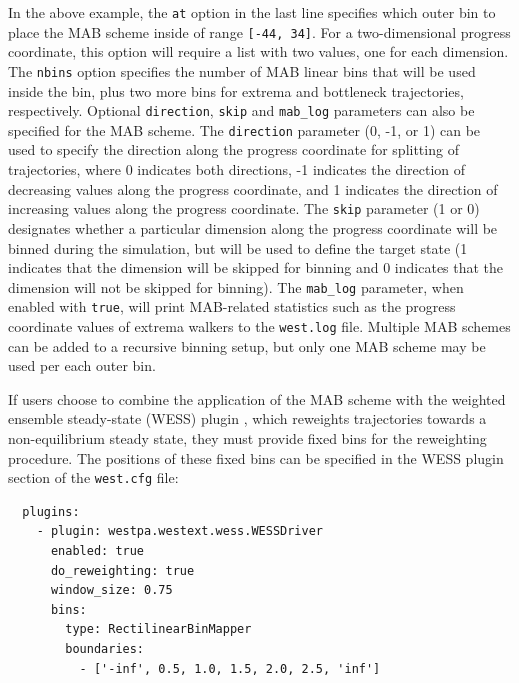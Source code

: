 In the above example, the \verb|at| option in the last line specifies which outer bin to place the MAB scheme inside of range \verb|[-44, 34]|. 
For a two-dimensional progress coordinate, this option will require a list with two values, one for each dimension. 
The \verb|nbins| option specifies the number of MAB linear bins that will be used inside the bin, plus two more bins for extrema and bottleneck trajectories, respectively. 
Optional \verb|direction|, \verb|skip| and \verb|mab_log| parameters can also be specified for the MAB scheme. 
The \verb|direction| parameter (0, -1, or 1) can be used to specify the direction along the progress coordinate for splitting of trajectories, where 0 indicates both directions, -1 indicates the direction of decreasing values along the progress coordinate, and 1 indicates the direction of increasing values along the progress coordinate. 
The \verb|skip| parameter  (1 or 0) designates whether a particular dimension along the progress coordinate will be binned during the simulation, but will be used to define the target state (1 indicates that the dimension will be skipped for binning and 0 indicates that the dimension will not be skipped for binning). 
The \verb|mab_log| parameter, when enabled with \verb|true|, will print MAB-related statistics such as the progress coordinate values of extrema walkers to the \verb|west.log| file. 
Multiple MAB schemes can be added to a recursive binning setup, but only one MAB scheme may be used per each outer bin.

If users choose to combine the application of the MAB scheme with the weighted ensemble steady-state (WESS) plugin \citep{bhatt_steady-state_2010}, which reweights trajectories towards a non-equilibrium steady state, they must provide fixed bins for the reweighting procedure. 
The positions of these fixed bins can be specified in the WESS plugin section of the \verb|west.cfg| file:

\begin{verbatim}
  plugins:
    - plugin: westpa.westext.wess.WESSDriver
      enabled: true
      do_reweighting: true
      window_size: 0.75
      bins:
        type: RectilinearBinMapper
        boundaries:
          - ['-inf', 0.5, 1.0, 1.5, 2.0, 2.5, 'inf']
          
\end{verbatim}

